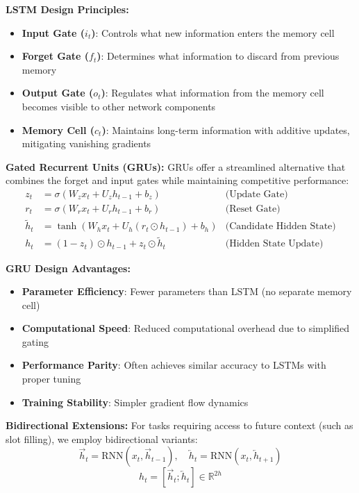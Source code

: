 \documentclass[conference]{IEEEtran}
\begin{document}
\textbf{LSTM Design Principles:}
\begin{itemize}
  \item \textbf{Input Gate ($i_t$)}: Controls what new information enters the memory cell
  \item \textbf{Forget Gate ($f_t$)}: Determines what information to discard from previous memory
  \item \textbf{Output Gate ($o_t$)}: Regulates what information from the memory cell becomes visible to other network components
  \item \textbf{Memory Cell ($c_t$)}: Maintains long-term information with additive updates, mitigating vanishing gradients
\end{itemize}

\textbf{Gated Recurrent Units (GRUs):}
GRUs offer a streamlined alternative that combines the forget and input gates while maintaining competitive performance:
\begin{align}
  z_t &= \sigma(W_z x_t + U_z h_{t-1} + b_z) & \text{(Update Gate)} \\
  r_t &= \sigma(W_r x_t + U_r h_{t-1} + b_r) & \text{(Reset Gate)} \\
  \tilde{h}_t &= \tanh(W_h x_t + U_h (r_t \odot h_{t-1}) + b_h) & \text{(Candidate Hidden State)} \\
  h_t &= (1 - z_t) \odot h_{t-1} + z_t \odot \tilde{h}_t & \text{(Hidden State Update)}
\end{align}

\textbf{GRU Design Advantages:}
\begin{itemize}
  \item \textbf{Parameter Efficiency}: Fewer parameters than LSTM (no separate memory cell)
  \item \textbf{Computational Speed}: Reduced computational overhead due to simplified gating
  \item \textbf{Performance Parity}: Often achieves similar accuracy to LSTMs with proper tuning
  \item \textbf{Training Stability}: Simpler gradient flow dynamics
\end{itemize}

\textbf{Bidirectional Extensions:}
For tasks requiring access to future context (such as slot filling), we employ bidirectional variants:
\begin{equation}
  \overrightarrow{h}_t = \text{RNN}(x_t, \overrightarrow{h}_{t-1}), \quad \overleftarrow{h}_t = \text{RNN}(x_t, \overleftarrow{h}_{t+1})
\end{equation}
\begin{equation}
  h_t = [\overrightarrow{h}_t; \overleftarrow{h}_t] \in \mathbb{R}^{2h}
\end{equation}
\end{document}

